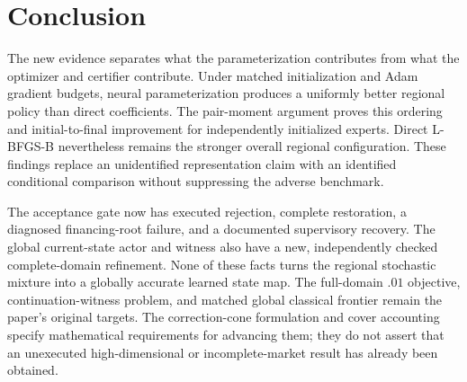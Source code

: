 \section{Conclusion}\label{sec:r22conclusion}
The new evidence separates what the parameterization contributes from what the optimizer and certifier contribute. Under matched initialization and Adam gradient budgets, neural parameterization produces a uniformly better regional policy than direct coefficients. The pair-moment argument proves this ordering and initial-to-final improvement for independently initialized experts. Direct L-BFGS-B nevertheless remains the stronger overall regional configuration. These findings replace an unidentified representation claim with an identified conditional comparison without suppressing the adverse benchmark.

The acceptance gate now has executed rejection, complete restoration, a diagnosed financing-root failure, and a documented supervisory recovery. The global current-state actor and witness also have a new, independently checked complete-domain refinement. None of these facts turns the regional stochastic mixture into a globally accurate learned state map. The full-domain $.01$ objective, continuation-witness problem, and matched global classical frontier remain the paper's original targets. The correction-cone formulation and cover accounting specify mathematical requirements for advancing them; they do not assert that an unexecuted high-dimensional or incomplete-market result has already been obtained.
